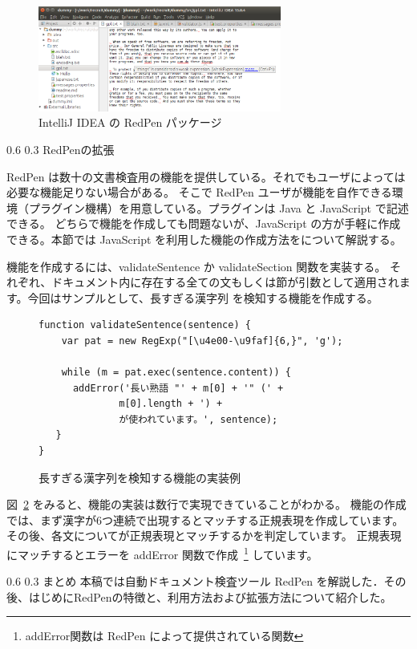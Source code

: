 \documentclass[a4j,twocolumn]{jarticle}
\makeatletter
\def\section{\@startsection{section}{1}{\z@}%
   {0.6\Cvs}%
   {0.3\Cvs}%
   {\reset@font\fontsize{10.5pt}{0pt}\bfseries}}
\makeatother
\begin{document}
\begin{figure}[thbp]
  \begin{center}
    \includegraphics[width=8cm]{figs/intellij.eps}
  \end{center}
  \caption{IntelliJ IDEA の RedPen パッケージ}
  \label{fig:intellij-idea}
\end{figure}  

\section{RedPenの拡張}
\label{sec:extension}

RedPen は数十の文書検査用の機能を提供している。それでもユーザによっては必要な機能足りない場合がある。
そこで RedPen ユーザが機能を自作できる環境（プラグイン機構）を用意している。プラグインは Java と JavaScript で記述できる。
どちらで機能を作成しても問題ないが、JavaScript の方が手軽に作成できる。本節では JavaScript を利用した機能の作成方法をについて解説する。

機能を作成するには、validateSentence か validateSection 関数を実装する。
それぞれ、ドキュメント内に存在する全ての文もしくは節が引数として適用されます。今回はサンプルとして、長すぎる漢字列
を検知する機能を作成する。

\begin{figure}
  \scriptsize
  \small
  \begin{verbatim}
function validateSentence(sentence) {
    var pat = new RegExp("[\u4e00-\u9faf]{6,}", 'g');

    while (m = pat.exec(sentence.content)) {
      addError('長い熟語 "' + m[0] + '" (' +
              m[0].length + ') +
              が使われています。', sentence);
   }
}
  \end{verbatim}
  \normalsize
  \caption{長すぎる漢字列を検知する機能の実装例}
  \label{fig:js-validator}
\end{figure}

図~\ref{fig:js-validator} をみると、機能の実装は数行で実現できていることがわかる。
機能の作成では、まず漢字が6つ連続で出現するとマッチする正規表現を作成しています。
その後、各文についてが正規表現とマッチするかを判定しています。
正規表現にマッチするとエラーを addError 関数で作成~\footnote{addError関数は RedPen によって提供されている関数} しています。

\section{まとめ}
本稿では自動ドキュメント検査ツール RedPen を解説した．その後、はじめにRedPenの特徴と、利用方法および拡張方法について紹介した。



\end{document}
